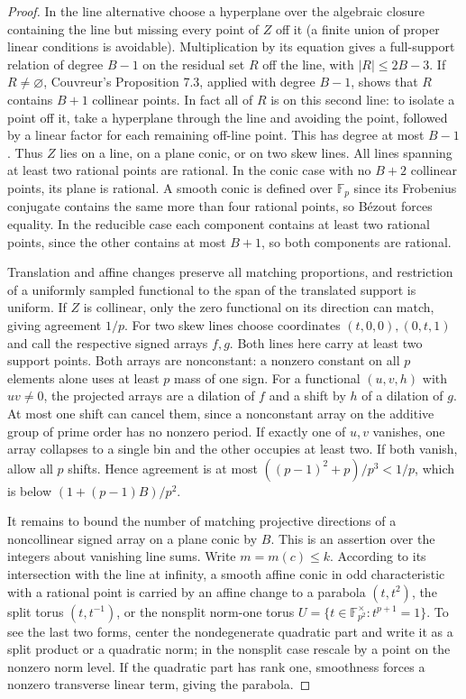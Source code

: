 \documentclass[11pt]{article}
\begin{document}
\begin{proof}
In the line alternative choose a hyperplane over the algebraic closure containing the line but missing every point of $Z$ off it (a finite union of proper linear conditions is avoidable). Multiplication by its equation gives a full-support relation of degree $B-1$ on the residual set $R$ off the line, with $|R|\le 2B-3$. If $R\ne\varnothing$, Couvreur's Proposition 7.3, applied with degree $B-1$, shows that $R$ contains $B+1$ collinear points. In fact all of $R$ is on this second line: to isolate a point off it, take a hyperplane through the line and avoiding the point, followed by a linear factor for each remaining off-line point. This has degree at most $B-1$. Thus $Z$ lies on a line, on a plane conic, or on two skew lines. All lines spanning at least two rational points are rational. In the conic case with no $B+2$ collinear points, its plane is rational. A smooth conic is defined over $\mathbb F_p$ since its Frobenius conjugate contains the same more than four rational points, so B\'ezout forces equality. In the reducible case each component contains at least two rational points, since the other contains at most $B+1$, so both components are rational.

Translation and affine changes preserve all matching proportions, and restriction of a uniformly sampled functional to the span of the translated support is uniform. If $Z$ is collinear, only the zero functional on its direction can match, giving agreement $1/p$. For two skew lines choose coordinates $(t,0,0),(0,t,1)$ and call the respective signed arrays $f,g$. Both lines here carry at least two support points. Both arrays are nonconstant: a nonzero constant on all $p$ elements alone uses at least $p$ mass of one sign. For a functional $(u,v,h)$ with $uv\ne0$, the projected arrays are a dilation of $f$ and a shift by $h$ of a dilation of $g$. At most one shift can cancel them, since a nonconstant array on the additive group of prime order has no nonzero period. If exactly one of $u,v$ vanishes, one array collapses to a single bin and the other occupies at least two. If both vanish, allow all $p$ shifts. Hence agreement is at most $((p-1)^2+p)/p^3<1/p$, which is below $(1+(p-1)B)/p^2$.

It remains to bound the number of matching projective directions of a noncollinear signed array on a plane conic by $B$. This is an assertion over the integers about vanishing line sums. Write $m=m(c)\le k$. According to its intersection with the line at infinity, a smooth affine conic in odd characteristic with a rational point is carried by an affine change to a parabola $(t,t^2)$, the split torus $(t,t^{-1})$, or the nonsplit norm-one torus $U=\{t\in\mathbb F_{p^2}^\times:t^{p+1}=1\}$. To see the last two forms, center the nondegenerate quadratic part and write it as a split product or a quadratic norm; in the nonsplit case rescale by a point on the nonzero norm level. If the quadratic part has rank one, smoothness forces a nonzero transverse linear term, giving the parabola.


\end{proof}
\end{document}

